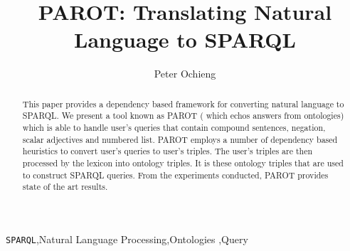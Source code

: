 \documentclass[review]{elsarticle}
\begin{document}
\begin{frontmatter}

\title{PAROT: Translating Natural Language  to SPARQL }


\author{Peter Ochieng}
\address{Taita Taveta university,\\Nairobi,Kenya\\
onexpeters@gmail.com }



\begin{abstract}
This paper provides  a dependency based framework for converting natural language to SPARQL. We present a tool known as PAROT ( which echos answers from ontologies) which is able to handle user's  queries that contain compound sentences, negation, scalar adjectives and numbered list. PAROT employs  a number of dependency based heuristics to convert user's queries to user's triples. The  user's  triples are then processed by the lexicon  into ontology triples. It is these ontology triples that are used to construct SPARQL queries. From the experiments conducted, PAROT provides state of the art results.
\end{abstract}
\begin{keyword}
\texttt{SPARQL}\sep Natural Language Processing\sep Ontologies \sep Query
\end{keyword}

\end{frontmatter}
\end{document}
